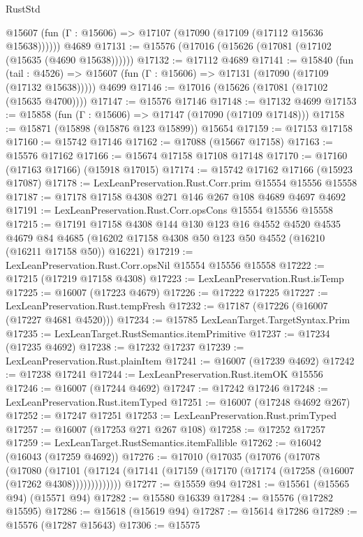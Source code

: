\begin{lexlean}{RustStd}
\begin{coremodule}
      @15607 (fun (Γ : @15606) => @17107 (@17090 (@17109 (@17112 @15636 @15638))))))
    @4689
@17131 := @15576 (@17016 (@15626 (@17081 (@17102 (@15635 (@4690 @15638))))))
@17132 := @17112 @4689
@17141 := @15840
    (fun (tail : @4526) => @15607 (fun (Γ : @15606) => @17131 (@17090 (@17109 (@17132 @15638)))))
    @4699
@17146 := @17016 (@15626 (@17081 (@17102 (@15635 @4700))))
@17147 := @15576 @17146
@17148 := @17132 @4699
@17153 := @15858 (fun (Γ : @15606) => @17147 (@17090 (@17109 @17148)))
@17158 := @15871 (@15898 (@15876 @123 @15899)) @15654
@17159 := @17153 @17158
@17160 := @15742 @17146
@17162 := @17088 (@15667 @17158)
@17163 := @15576 @17162
@17166 := @15674 @17158 @17108 @17148
@17170 := @17160 (@17163 @17166) (@15918 @17015)
@17174 := @15742 @17162 @17166 (@15923 @17087)
@17178 := LexLeanPreservation.Rust.Corr.prim @15554 @15556 @15558
@17187 := @17178 @17158 @4308 @271 @146 @267 @108 @4689 @4697 @4692
@17191 := LexLeanPreservation.Rust.Corr.opsCons @15554 @15556 @15558
@17215 := @17191
    @17158
    @4308
    @144
    @130
    @123
    @16
    @4552
    @4520
    @4535
    @4679
    @84
    @4685
    (@16202 @17158 @4308 @50 @123 @50 @4552 (@16210 (@16211 @17158 @50)) @16221)
@17219 := LexLeanPreservation.Rust.Corr.opsNil @15554 @15556 @15558
@17222 := @17215 (@17219 @17158 @4308)
@17223 := LexLeanPreservation.Rust.isTemp
@17225 := @16007 (@17223 @4679)
@17226 := @17222 @17225
@17227 := LexLeanPreservation.Rust.tempFresh
@17232 := @17187 (@17226 (@16007 (@17227 @4681 @4520)))
@17234 := @15785 LexLeanTarget.TargetSyntax.Prim
@17235 := LexLeanTarget.RustSemantics.itemPrimitive
@17237 := @17234 (@17235 @4692)
@17238 := @17232 @17237
@17239 := LexLeanPreservation.Rust.plainItem
@17241 := @16007 (@17239 @4692)
@17242 := @17238 @17241
@17244 := LexLeanPreservation.Rust.itemOK @15556
@17246 := @16007 (@17244 @4692)
@17247 := @17242 @17246
@17248 := LexLeanPreservation.Rust.itemTyped
@17251 := @16007 (@17248 @4692 @267)
@17252 := @17247 @17251
@17253 := LexLeanPreservation.Rust.primTyped
@17257 := @16007 (@17253 @271 @267 @108)
@17258 := @17252 @17257
@17259 := LexLeanTarget.RustSemantics.itemFallible
@17262 := @16042 (@16043 (@17259 @4692))
@17276 := @17010
    (@17035
      (@17076
        (@17078
          (@17080
            (@17101
              (@17124 (@17141 (@17159 (@17170 (@17174 (@17258 (@16007 (@17262 @4308)))))))))))))
@17277 := @15559 @94
@17281 := @15561 (@15565 @94) (@15571 @94)
@17282 := @15580 @16339
@17284 := @15576 (@17282 @15595)
@17286 := @15618 (@15619 @94)
@17287 := @15614 @17286
@17289 := @15576 (@17287 @15643)
@17306 := @15575

\end{coremodule}
\end{lexlean}
